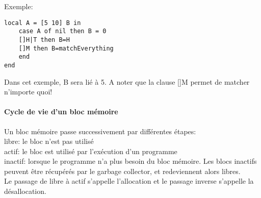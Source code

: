 Exemple:

\begin{lstlisting}
local A = [5 10] B in
	case A of nil then B = 0
	[]H|T then B=H
	[]M then B=matchEverything
	end
end
\end{lstlisting}

Dans cet exemple, B sera lié à 5. A noter que la clause []M permet de matcher n'importe quoi!

\paragraph{Cycle de vie d'un bloc mémoire}

Un bloc mémoire passe successivement par différentes étapes:\\
libre: le bloc n'est pas utilisé\\
actif: le bloc est utilisé par l'exécution d'un programme\\
inactif: lorsque le programme n'a plus besoin du bloc mémoire. Les blocs inactifs peuvent être récupérés par le garbage collector, et redeviennent alors libres.\\
Le passage de libre à actif s'appelle l'allocation et le passage inverse s'appelle la désallocation.









